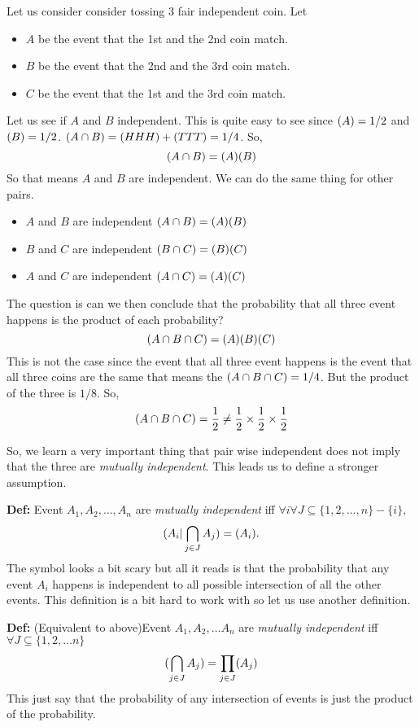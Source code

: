 \documentclass[a4paper, 12pt]{article}
\newcommand{\half}{\ensuremath{\frac{1}{2}}}
\newcommand{\definition}{\vspace{1em}\noindent\textbf{Def:} }
\let\Pr\relax
\DeclareMathOperator{\Pr}{Pr}
\begin{document}
\begin{multicols}{2}
Let us consider consider tossing 3 fair independent coin. Let
\begin{itemize}
	\item $A$ be the event that the 1st and the 2nd coin match.
	\item $B$ be the event that the 2nd and the 3rd coin match.
	\item $C$ be the event that the 1st and the 3rd coin match.
\end{itemize}

Let us see if $A$ and $B$ independent. This is quite easy to see since $\Pr(A) = 1/2$ and $\Pr(B) = 1/2$. $\Pr(A\cap B) = \Pr(HHH) + \Pr(TTT) = 1/4$. So,
\[
	\Pr(A\cap B) = \Pr(A)\Pr(B)
\]
So that means $A$ and $B$ are independent. We can do the same thing for other pairs.
\begin{itemize}
	\item $A$ and $B$ are independent $\Pr(A\cap B) = \Pr(A)\Pr(B)$
	\item $B$ and $C$ are independent $\Pr(B\cap C) = \Pr(B)\Pr(C)$
	\item $A$ and $C$ are independent $\Pr(A\cap C) = \Pr(A)\Pr(C)$
\end{itemize}

The question is can we then conclude that the probability that all three event happens is the product of each probability?
\[
	\Pr(A\cap B \cap C) = \Pr(A) \Pr(B) \Pr(C)
\]
This is not the case since the event that all three event happens is the event that all three coins are the same that means the $\Pr(A\cap B\cap C)=1/4$. But the product of the three is $1/8$. So,
\[
	\Pr(A\cap B \cap C)=\frac{1}{2} \ne \half\times\half\times\half
\]

So, we learn a very important thing that pair wise independent does not imply that the three are \emph{mutually independent}. This leads us to define a stronger assumption.

\definition Event $A_1, A_2, \ldots, A_n$ are \emph{mutually independent} iff $\forall i \forall J \subseteq \{1,2,\ldots, n\}-\{i\}, $
\[
	\Pr(A_i | \bigcap\limits_{j \in J} A_j) = \Pr(A_i).
\]
The symbol looks a bit scary but all it reads is that the probability that any event $A_i$ happens is independent to all possible intersection of all the other events. This definition is a bit hard to work with so let us use another definition.

\definition (Equivalent to above)Event $A_1, A_2, \ldots A_n$ are \emph{mutually independent} iff $\forall J \subseteq \{1,2,\ldots n\}$
\[
	\Pr(\bigcap\limits_{j \in J} A_j) = \prod_{j \in J} \Pr (A_j)
\]
This just say that the probability of any intersection of events is just the product of the probability.


\end{multicols}
\end{document}
